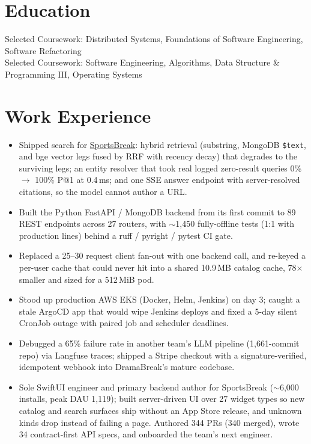 \documentclass[11pt, letterpaper]{article}
\begin{document}

\section{Education}
Selected Coursework: Distributed Systems, Foundations of Software Engineering, Software Refactoring\\[1pt]
Selected Coursework: Software Engineering, Algorithms, Data Structure \& Programming III, Operating Systems

\section{Work Experience}
\begin{itemize}
  \item Shipped search for \href{https://apps.apple.com/app/id6762649287}{SportsBreak}: hybrid retrieval (substring, MongoDB \texttt{\$text}, and bge vector legs fused by RRF with recency decay) that degrades to the surviving legs; an entity resolver that took real logged zero-result queries 0\% $\to$ 100\% P@1 at 0.4\,ms; and one SSE answer endpoint with server-resolved citations, so the model cannot author a URL.
  \item Built the Python FastAPI / MongoDB backend from its first commit to 89 REST endpoints across 27 routers, with $\sim$1{,}450 fully-offline tests (1:1 with production lines) behind a ruff / pyright / pytest CI gate.
  \item Replaced a 25--30 request client fan-out with one backend call, and re-keyed a per-user cache that could never hit into a shared 10.9\,MB catalog cache, 78$\times$ smaller and sized for a 512\,MiB pod.
  \item Stood up production AWS EKS (Docker, Helm, Jenkins) on day 3; caught a stale ArgoCD app that would wipe Jenkins deploys and fixed a 5-day silent CronJob outage with paired job and scheduler deadlines.
  \item Debugged a 65\% failure rate in another team's LLM pipeline (1{,}661-commit repo) via Langfuse traces; shipped a Stripe checkout with a signature-verified, idempotent webhook into DramaBreak's mature codebase.
  \item Sole SwiftUI engineer and primary backend author for SportsBreak ($\sim$6{,}000 installs, peak DAU 1{,}119); built server-driven UI over 27 widget types so new catalog and search surfaces ship without an App Store release, and unknown kinds drop instead of failing a page. Authored 344 PRs (340 merged), wrote 34 contract-first API specs, and onboarded the team's next engineer.
\end{itemize}
\end{document}
